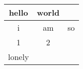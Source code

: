 \begin{tabular}{| c | c | c | }
\hline
hello & world \\
\hline
i & am & so \\
\hline
1 & 2 \\
\hline
lonely \\
\hline
\end{tabular}
